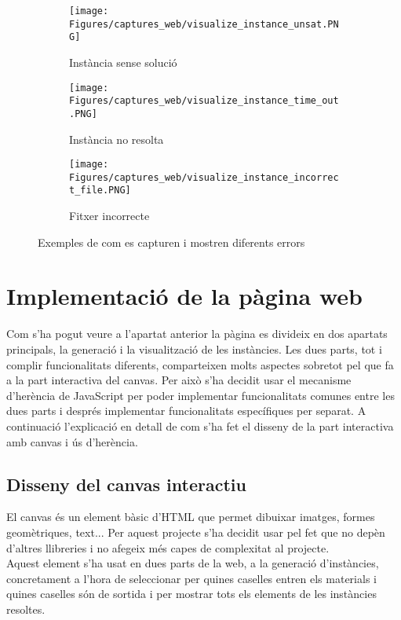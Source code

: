 \begin{figure}[H]
    \centering
    \begin{subfigure}{0.3\textwidth}
        \texttt{[image: Figures/captures\_web/visualize\_instance\_unsat.PNG]}
        \caption{Instància sense solució}
    \end{subfigure}
    \hfill
    \begin{subfigure}{0.3\textwidth}
        \texttt{[image: Figures/captures\_web/visualize\_instance\_time\_out.PNG]}
        \caption{Instància no resolta}
    \end{subfigure}
    \hfill
    \begin{subfigure}{0.3\textwidth}
        \texttt{[image: Figures/captures\_web/visualize\_instance\_incorrect\_file.PNG]}
        \caption{Fitxer incorrecte}
    \end{subfigure}
    \caption{Exemples de com es capturen i mostren diferents errors}
\end{figure}


\section{Implementació de la pàgina web}
Com s'ha pogut veure a l'apartat anterior la pàgina es divideix en dos apartats principals, la generació i la visualització de les instàncies. Les dues parts, tot i complir funcionalitats diferents, comparteixen molts aspectes sobretot pel que fa a la part interactiva del canvas. Per això s'ha decidit usar el mecanisme d'herència de JavaScript per poder implementar funcionalitats comunes entre les dues parts i després implementar funcionalitats específiques per separat. A continuació l'explicació en detall de com s'ha fet el disseny de la part interactiva amb canvas i ús d'herència.

\subsection{Disseny del canvas interactiu}
El canvas és un element bàsic d'HTML que permet dibuixar imatges, formes geomètriques, text... Per aquest projecte s'ha decidit usar pel fet que no depèn d'altres llibreries i no afegeix més capes de complexitat al projecte.\\
Aquest element s'ha usat en dues parts de la web, a la generació d'instàncies, concretament a l'hora de seleccionar per quines caselles entren els materials i quines caselles són de sortida i per mostrar tots els elements de les instàncies resoltes.\\

